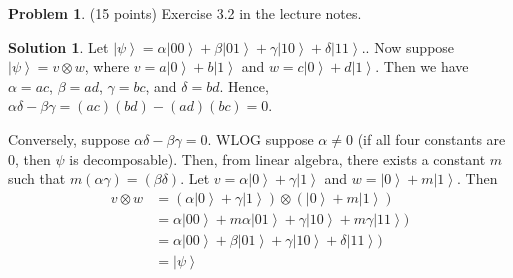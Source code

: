 \documentclass{article}
\theoremstyle{definition}
\newtheorem{problem}{Problem}
\newtheorem*{solution}{Solution}
\begin{document}
\begin{problem} (15 points)
Exercise 3.2 in the lecture notes.
\end{problem}
\begin{solution}
Let $\left| \psi \right\rangle = \alpha \left| 00 \right\rangle + \beta \left| 01 \right\rangle + \gamma \left| 10 \right\rangle + \delta \left| 11 \right\rangle.$.
Now suppose $\left| \psi \right\rangle = v \otimes w$, where $v = a \left| 0 \right\rangle + b \left| 1 \right\rangle$ and $w = c\left| 0 \right\rangle + d \left| 1 \right\rangle$.  Then we have $\alpha = ac$, $\beta = ad$, $\gamma = bc$, and $\delta = bd$.  Hence, $\alpha\delta - \beta\gamma = (ac)(bd) - (ad)(bc) = 0$.

Conversely, suppose $\alpha\delta - \beta\gamma = 0$. WLOG suppose $\alpha \neq 0$ (if all four constants are 0, then $\psi$ is decomposable). Then, from linear algebra, there exists a constant $m$ such that $m(\alpha \gamma) = (\beta \delta)$.  
Let $v = \alpha \left| 0 \right\rangle +  \gamma\left| 1 \right\rangle$ and $w =  \left| 0 \right\rangle + m \left| 1 \right\rangle$.
Then 
\begin{align*}
v \otimes w & = (\alpha \left| 0 \right\rangle +  \gamma\left| 1 \right\rangle) \otimes (\left| 0 \right\rangle + m \left| 1 \right\rangle) \\ 
& = \alpha \left| 00 \right\rangle + m\alpha \left| 01 \right\rangle + \gamma \left| 10 \right\rangle + m\gamma \left| 1 1 \right\rangle) \\
& = \alpha \left| 00 \right\rangle + \beta \left| 01 \right\rangle + \gamma \left| 10 \right\rangle + \delta \left| 1 1 \right\rangle) \\
& = \left| \psi \right\rangle
\end{align*}
\end{solution}
\end{document}
